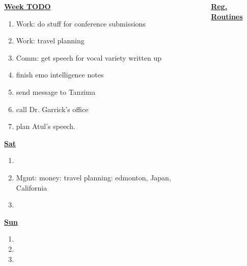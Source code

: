 \documentclass[serif,mathserif,final]{beamer}
\begin{document}
\begin{frame}{}
\begin{columns}[t]
\begin{column}{0.33\linewidth}{\textbf{\underline{Week TODO}}}
\begin{block}
\begin{enumerate}
\item \tiny Work: do stuff for conference submissions 

\item \tiny Work: travel planning 

\item \tiny Comm: get speech for vocal variety written up 

\tiny \item \tiny finish emo intelligence notes 
\item \tiny send message to Tanzima 
\item \tiny call Dr. Garrick's office 
\item \tiny plan Atul's speech. 
\end{enumerate} 

\textbf{\underline{Sat}} 
\begin{enumerate} 
\tiny \item \tiny 
\item \tiny Mgmt: money: travel planning: edmonton, Japan, California 
\item \tiny 
\end{enumerate} 


\textbf{\underline{Sun}}

\begin{enumerate} 
\tiny \item \tiny 
\item \tiny 
\item \tiny 
\end{enumerate} 

\end{block} 

\end{column}%

\begin{column}{0.27\linewidth} {\textbf{\underline{Reg. Routines}}}


\end{column}
\end{columns}
\end{frame}
\end{document}
